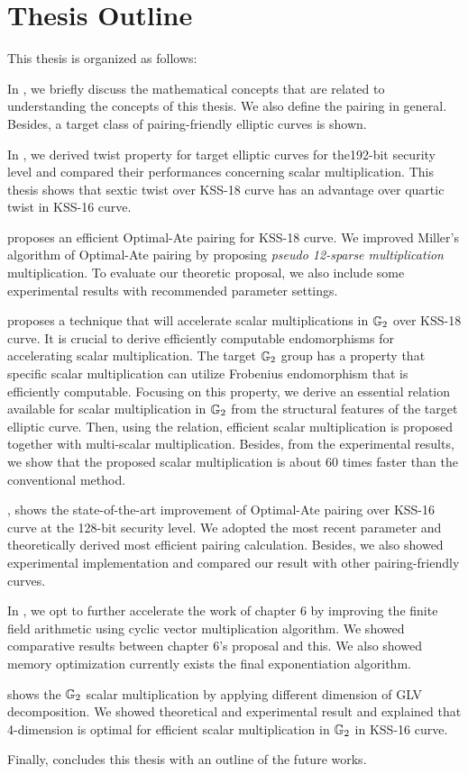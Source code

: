 \section{Thesis Outline}
\label{ch1_sec_outline}
This thesis is organized as follows: 

In , we briefly discuss the mathematical concepts that are related to understanding the concepts of this thesis.
We also define the pairing in general. 
Besides, a target class of pairing-friendly elliptic curves is shown.

In , we derived twist property for target elliptic curves for the192-bit security level and compared their performances concerning scalar multiplication.
This thesis shows that sextic twist over KSS-18 curve has an advantage over quartic twist in KSS-16 curve.

 proposes an efficient Optimal-Ate pairing for KSS-18 curve. 
We improved Miller's algorithm of Optimal-Ate pairing by proposing \textit{pseudo 12-sparse multiplication} multiplication.
To evaluate our theoretic proposal, we also include some experimental results with recommended parameter settings.

 proposes a technique that will accelerate scalar multiplications in ${\mathbb{G}}_{2}$ over KSS-18 curve. 
It is crucial to derive efficiently computable endomorphisms for accelerating scalar multiplication.
The target ${\mathbb{G}}_{2}$ group has a property that specific scalar multiplication can utilize  Frobenius endomorphism that is efficiently computable.
Focusing on this property, we derive an essential relation available for scalar multiplication in ${\mathbb{G}}_{2}$ from the structural features of the target elliptic curve.
Then, using the relation, efficient scalar multiplication is proposed together with multi-scalar multiplication.
Besides, from the experimental results, we show that the proposed scalar multiplication is about 60 times faster than the conventional method.  

, shows the state-of-the-art improvement of Optimal-Ate pairing over KSS-16 curve at the 128-bit security level.
We adopted the most recent parameter and theoretically derived most efficient pairing calculation.
Besides, we also showed experimental implementation and compared our result with other pairing-friendly curves.


In , we opt to further accelerate the work of chapter 6 by improving the finite field arithmetic using cyclic vector multiplication algorithm.
We showed comparative results between chapter 6's proposal and this. 
We also showed memory optimization currently exists the final exponentiation algorithm.

 shows the   ${\mathbb{G}}_{2}$  scalar multiplication by applying different dimension of GLV decomposition.
We showed theoretical and experimental result and explained that 4-dimension is optimal for efficient scalar multiplication in  ${\mathbb{G}}_{2}$ in KSS-16 curve.

Finally,  concludes this thesis with an outline of the future works.


